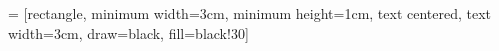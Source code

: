  = [rectangle, minimum width=3cm, minimum height=1cm, text centered, text width=3cm, draw=black, fill=black!30]

%
%

